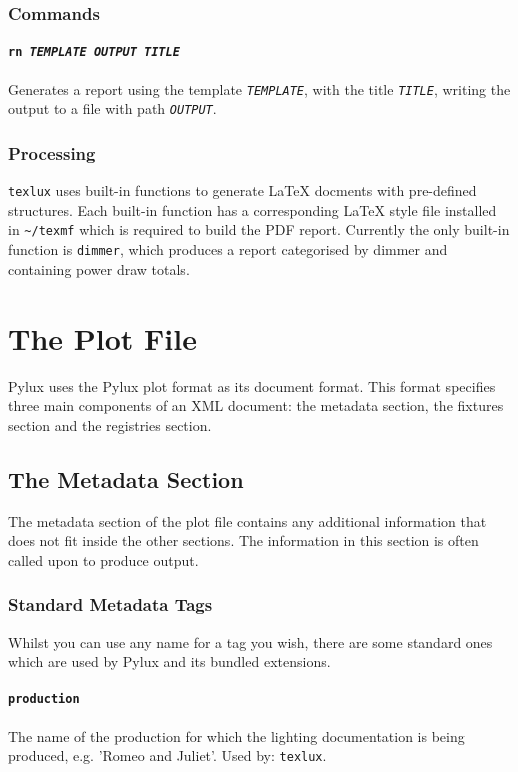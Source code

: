 \documentclass[a4paper]{article}
\begin{document}
\subsubsection{Commands}

\paragraph{\texttt{rn \textit{TEMPLATE OUTPUT TITLE}}}
Generates a report using the template \texttt{\textit{TEMPLATE}}, with the 
title \texttt{\textit{TITLE}}, writing the output to a file with path 
\texttt{\textit{OUTPUT}}.

\subsubsection{Processing}

\texttt{texlux} uses built-in functions to generate \LaTeX{} docments with 
pre-defined structures. Each built-in function has a corresponding \LaTeX{} 
style file installed in \texttt{\~{}/texmf} which is required to build 
the PDF report. Currently the only built-in function is \texttt{dimmer}, which 
produces a report categorised by dimmer and containing power draw totals.

\section{The Plot File} \label{sec:plotfile}
Pylux uses the Pylux plot format as its document format. This format 
specifies three main components of an XML document: the metadata section, the 
fixtures section and the registries section. 

\subsection{The Metadata Section}
The metadata section of the plot file contains any additional information 
that does not fit inside the other sections. The information in this section 
is often called upon to produce output.

\subsubsection{Standard Metadata Tags}
Whilst you can use any name for a tag you wish, there are some standard ones 
which are used by Pylux and its bundled extensions.

\paragraph{\texttt{production}}
The name of the production for which the lighting documentation is being 
produced, e.g. 'Romeo and Juliet'. Used by: \texttt{texlux}.
\end{document}
